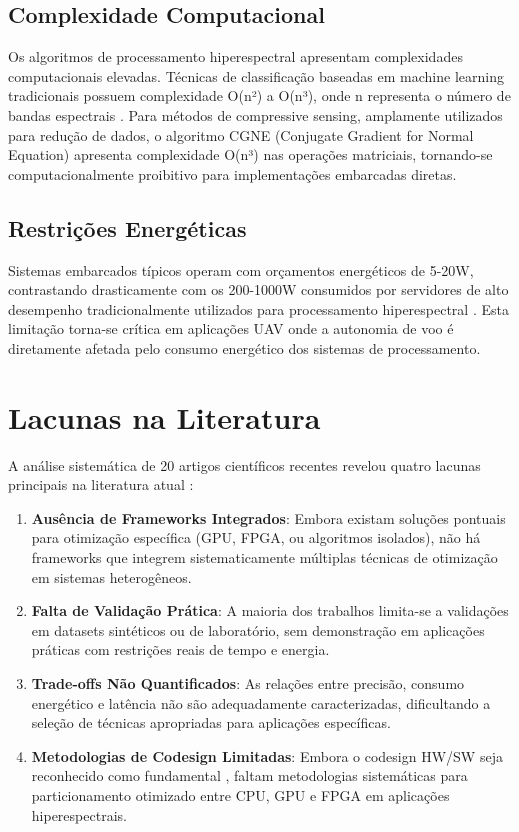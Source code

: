 \subsection{Complexidade Computacional}

Os algoritmos de processamento hiperespectral apresentam complexidades computacionais elevadas. Técnicas de classificação baseadas em machine learning tradicionais possuem complexidade O(n²) a O(n³), onde n representa o número de bandas espectrais \cite{lim2022}. Para métodos de compressive sensing, amplamente utilizados para redução de dados, o algoritmo CGNE (Conjugate Gradient for Normal Equation) apresenta complexidade O(n³) nas operações matriciais, tornando-se computacionalmente proibitivo para implementações embarcadas diretas.

\subsection{Restrições Energéticas}

Sistemas embarcados típicos operam com orçamentos energéticos de 5-20W, contrastando drasticamente com os 200-1000W consumidos por servidores de alto desempenho tradicionalmente utilizados para processamento hiperespectral \cite{hwang2011}. Esta limitação torna-se crítica em aplicações UAV onde a autonomia de voo é diretamente afetada pelo consumo energético dos sistemas de processamento.

\section{Lacunas na Literatura}

A análise sistemática de 20 artigos científicos recentes revelou quatro lacunas principais na literatura atual \cite{lou2024, uav_review_2024}:

\begin{enumerate}
\item \textbf{Ausência de Frameworks Integrados}: Embora existam soluções pontuais para otimização específica (GPU, FPGA, ou algoritmos isolados), não há frameworks que integrem sistematicamente múltiplas técnicas de otimização em sistemas heterogêneos.

\item \textbf{Falta de Validação Prática}: A maioria dos trabalhos limita-se a validações em datasets sintéticos ou de laboratório, sem demonstração em aplicações práticas com restrições reais de tempo e energia.

\item \textbf{Trade-offs Não Quantificados}: As relações entre precisão, consumo energético e latência não são adequadamente caracterizadas, dificultando a seleção de técnicas apropriadas para aplicações específicas.

\item \textbf{Metodologias de Codesign Limitadas}: Embora o codesign HW/SW seja reconhecido como fundamental \cite{hwang2011}, faltam metodologias sistemáticas para particionamento otimizado entre CPU, GPU e FPGA em aplicações hiperespectrais.
\end{enumerate}

